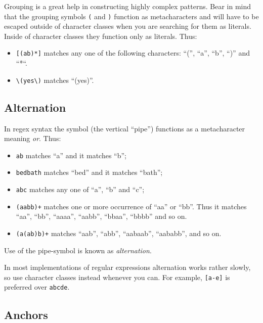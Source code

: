 \documentclass[]{book}
\providecommand{\tightlist}{%
  \setlength{\itemsep}{0pt}\setlength{\parskip}{0pt}}
\theoremstyle{definition}
\theoremstyle{definition}
\theoremstyle{definition}
\theoremstyle{remark}
\begin{document}
{Grouping is a great help in constructing highly complex patterns. Bear
in mind that the grouping symbols \texttt{(} and \texttt{)} function as
metacharacters and will have to be escaped outside of character classes
when you are searching for them as literals. Inside of character classes
they function only as literals. Thus:

\begin{itemize}
\tightlist
\item
  \texttt{{[}(ab)*{]}} matches any one of the following characters:
  ``('', ``a'', ``b'', ``)'' and ``*``.
\item
  \texttt{\textbackslash{}(yes\textbackslash{})} matches ``(yes)''.
\end{itemize}

\subsection{Alternation}\label{alternation}

 In regex syntax the symbol \texttt{\textbar{}} (the
vertical ``pipe'') functions as a metacharacter meaning \emph{or}. Thus:

\begin{itemize}
\tightlist
\item
  \texttt{a\textbar{}b} matches ``a'' and it matches ``b'';
\item
  \texttt{bed\textbar{}bath} matches ``bed'' and it matches ``bath'';
\item
  \texttt{a\textbar{}b\textbar{}c} matches any one of ``a'', ``b'' and
  ``c'';
\item
  \texttt{(aa\textbar{}bb)+} matches one or more occurrence of ``aa'' or
  ``bb''. Thus it matches ``aa'', ``bb'', ``aaaa'', ``aabb'', ``bbaa'',
  ``bbbb'' and so on.
\item
  \texttt{(a(a\textbar{}b)b)+} matches ``aab'', ``abb'', ``aabaab'',
  ``aababb'', and so on.
\end{itemize}

Use of the pipe-symbol is known as \emph{alternation}.

In most implementations of regular expressions alternation works rather
slowly, so use character classes instead whenever you can. For example,
\texttt{{[}a-e{]}} is preferred over
\texttt{a\textbar{}b\textbar{}c\textbar{}d\textbar{}e}.

\subsection{Anchors}\label{anchors}

}
\end{document}
